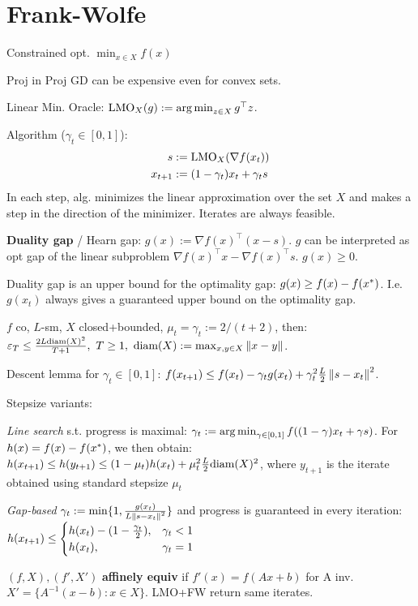 \section*{Frank-Wolfe}
Constrained opt. $\min_{x \in X} f(x)$

Proj in Proj GD can be expensive even for convex sets.

Linear Min. Oracle: $\text{LMO}_X (g) := \operatorname*{arg\,min}_{z\in X} g^\top z$.

Algorithm ($\gamma_t \in [0, 1]$):
\begin{align*}
    s &:= \text{LMO}_X (\nabla f(x_t)) \\
    x_{{t+1}} &:= (1 - \gamma_t) x_t + \gamma_t s
\end{align*}
In each step, alg. minimizes the linear approximation over the set $X$ and makes a step in the direction of the minimizer. Iterates are always feasible. 

\textbf{Duality gap} / Hearn gap: $g(x) := \nabla f(x)^\top (x - s)$. $g$ can be interpreted as opt gap of the linear subproblem $\nabla f(x)^\top x - \nabla f(x)^\top s$. $g(x) \geq 0$.

Duality gap is an upper bound for the optimality gap: $g(x) \geq f(x) - f(x^*)$. I.e. $g(x_t)$ always gives a guaranteed upper bound on the optimality gap.


$f$ co, $L$-sm, $X$ closed+bounded, $\mu_t = \gamma_t := 2/(t+2)$, then: $\varepsilon_T \leq \frac{2L \text{diam}(X)^2}{T+1}, \ T \geq 1, \ \text{diam}(X) := \max_{x,y \in X} \left\lVert x - y \right\rVert$.

Descent lemma for $\gamma_t \in [0, 1]$: $f(x_{{t+1}}) \leq f(x_t) - \gamma_t g(x_t) + \gamma_t^2 \frac{L}{2} \left\lVert s - x_t \right\rVert^2$.

Stepsize variants:

\textit{Line search} s.t. progress is maximal: $\gamma_t := \operatorname*{arg\,min}_{\gamma \in [0, 1]} f((1-\gamma)x_t + \gamma s)$. For $h(x) = f(x) - f(x^*)$, we then obtain: $h(x_{{t+1}}) \leq h(y_{t+1}) \leq (1 - \mu_t) h(x_t) + \mu_t^2 \frac{L}{2} \text{diam}(X)^2$, where $y_{t+1}$ is the iterate obtained using standard stepsize $\mu_t$

\textit{Gap-based} $\gamma_t := \min\{1, \frac{g(x_t)}{L \left\lVert s - x_t \right\rVert^2}\}$ and progress is guaranteed in every iteration: $h(x_{{t+1}}) \leq \begin{cases} h(x_t) - (1 - \frac{\gamma_t}{2}), & \gamma_t < 1 \\ h(x_t), & \gamma_t = 1 \end{cases}$


$(f, X), (f', X')$ \textbf{affinely equiv} if $f'(x) = f(Ax+b)$ for A inv. $X' = \{ A^{-1}(x-b) : x \in X\}$. LMO+FW return same iterates.